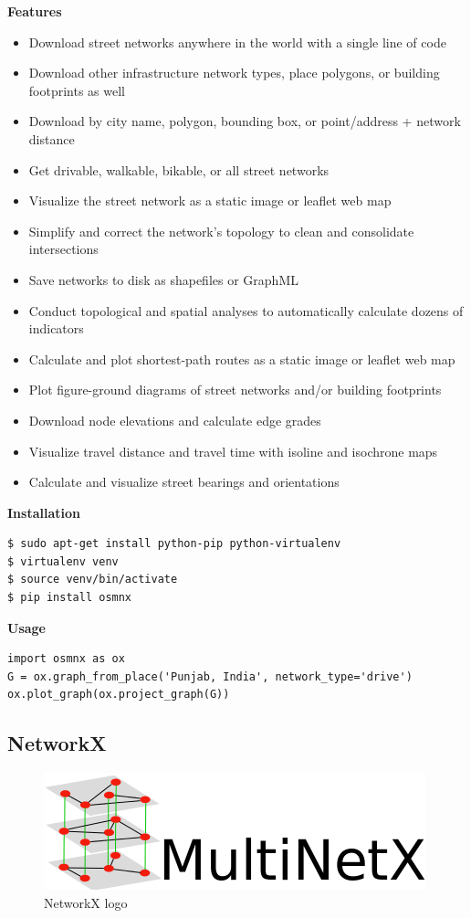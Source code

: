 {\bf Features}
\begin{itemize}
\item Download street networks anywhere in the world with a single line of code
\item Download other infrastructure network types, place polygons, or building footprints as well
\item Download by city name, polygon, bounding box, or point/address + network distance
\item Get drivable, walkable, bikable, or all street networks
\item Visualize the street network as a static image or leaflet web map
\item Simplify and correct the network’s topology to clean and consolidate intersections
\item Save networks to disk as shapefiles or GraphML
\item Conduct topological and spatial analyses to automatically calculate dozens of indicators
\item Calculate and plot shortest-path routes as a static image or leaflet web map
\item Plot figure-ground diagrams of street networks and/or building footprints
\item Download node elevations and calculate edge grades
\item Visualize travel distance and travel time with isoline and isochrone maps
\item Calculate and visualize street bearings and orientations\\

\end{itemize}


{\bf Installation}
\begin{verbatim}
$ sudo apt-get install python-pip python-virtualenv
$ virtualenv venv
$ source venv/bin/activate
$ pip install osmnx
\end{verbatim}

{\bf Usage}
\begin{verbatim}
import osmnx as ox
G = ox.graph_from_place('Punjab, India', network_type='drive')
ox.plot_graph(ox.project_graph(G))
\end{verbatim}


\subsection{NetworkX}

\begin{figure}[h]
\centering \includegraphics[scale=0.5]{input/images/networkx.png}
\caption{NetworkX logo}
\end{figure}

